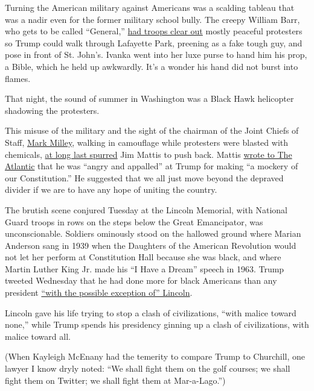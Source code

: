 Turning the American military against Americans was a scalding tableau
that was a nadir even for the former military school bully. The creepy
William Barr, who gets to be called ``General,''
\href{https://www.nytimes.com/2020/06/02/us/politics/trump-walk-lafayette-square.html}{had
troops clear out} mostly peaceful protesters so Trump could walk through
Lafayette Park, preening as a fake tough guy, and pose in front of St.
John's. Ivanka went into her luxe purse to hand him his prop, a Bible,
which he held up awkwardly. It's a wonder his hand did not burst into
flames.

That night, the sound of summer in Washington was a Black Hawk
helicopter shadowing the protesters.

This misuse of the military and the sight of the chairman of the Joint
Chiefs of Staff,
\href{https://www.nytimes.com/2020/06/05/us/politics/protests-milley-trump.html}{Mark
Milley}, walking in camouflage while protesters were blasted with
chemicals,
\href{https://www.washingtonpost.com/politics/how-mattis-reached-his-breaking-point--and-decided-to-speak-out-against-trump/2020/06/05/6aafd548-a69e-11ea-bb20-ebf0921f3bbd_story.html}{at
long last spurred} Jim Mattis to push back. Mattis
\href{https://www.theatlantic.com/politics/archive/2020/06/james-mattis-denounces-trump-protests-militarization/612640/}{wrote
to The Atlantic} that he was ``angry and appalled'' at Trump for making
``a mockery of our Constitution.'' He suggested that we all just move
beyond the depraved divider if we are to have any hope of uniting the
country.

The brutish scene conjured Tuesday at the Lincoln Memorial, with
National Guard troops in rows on the steps below the Great Emancipator,
was unconscionable. Soldiers ominously stood on the hallowed ground
where Marian Anderson sang in 1939 when the Daughters of the American
Revolution would not let her perform at Constitution Hall because she
was black, and where Martin Luther King Jr. made his ``I Have a Dream''
speech in 1963. Trump tweeted Wednesday that he had done more for black
Americans than any president
\href{https://twitter.com/realDonaldTrump/status/1268167411230007300}{``with
the possible exception of'' Lincoln}.

Lincoln gave his life trying to stop a clash of civilizations, ``with
malice toward none,'' while Trump spends his presidency ginning up a
clash of civilizations, with malice toward all.

(When Kayleigh McEnany had the temerity to compare Trump to Churchill,
one lawyer I know dryly noted: ``We shall fight them on the golf
courses; we shall fight them on Twitter; we shall fight them at
Mar-a-Lago.'')

